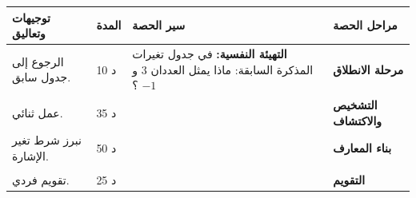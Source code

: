 \documentclass[12pt,a4paper]{article}
\newenvironment{LTR}{\begin{otherlanguage}{english}}{\end{otherlanguage}}
\newcommand{\ar}[1]{\foreignlanguage{arabic}{#1}}
\newcommand{\Phase}[1]{\textbf{#1}}
\newenvironment{Sayr}{%
\begin{LTR}\renewcommand{\arraystretch}{1.25}
\begin{longtable}{|p{0.17\textwidth}|>{\centering\arraybackslash}p{0.06\textwidth}|p{0.53\textwidth}|>{\centering\arraybackslash}p{0.12\textwidth}|}
\hline\rowcolor{cThm!12}\ar{\textbf{توجيهات وتعاليق}} & \ar{\textbf{المدة}} & \ar{\textbf{سير الحصة}} & \ar{\textbf{مراحل الحصة}}\\\hline\endhead
\hline\endfoot}{\end{longtable}\end{LTR}}
\newcommand{\Row}[4]{\ar{\small #4} & \ar{#3} & \ar{#2} & \cellcolor{cThm!8}\ar{\Phase{#1}}\\\hline}
\newcommand{\Lab}[2]{\foreignlanguage{english}{\tcbox[on line,colback=#1,colframe=#1,boxrule=0pt,arc=2pt,boxsep=1pt,left=5pt,right=5pt,top=1pt,bottom=1pt]{\ar{\textcolor{white}{\textbf{#2}}}}}}
\newcommand{\ck}{\ensuremath{{\color{cRem}\checkmark}}}
\begin{document}
\begin{Sayr}
\Row{مرحلة الانطلاق}{%
\textbf{التهيئة النفسية:} في جدول تغيرات المذكرة السابقة: ماذا يمثل العددان $3$ و $-1$ ؟}{10 د}{الرجوع إلى جدول سابق.}
\Row{التشخيص والاكتشاف}{%
\Lab{cEx}{وضعية مقترحة}\ $f(x)=x^2+2x+3$.\par\ck\ $f^{\prime}(x)=2x+2$ تنعدم عند $-1$ مغيرة إشارتها.\par
\ck\ $f(-1)=2$ أصغر قيمة لـ $f$ ؛ والمماس عند $(-1;2)$ أفقي.\par
}{35 د}{عمل ثنائي.}
\Row{بناء المعارف}{%
\Lab{cDef}{تعريف}\ $f(x_0)$ \textbf{قيمة حدية عظمى محلية} إذا وُجد مجال مفتوح $I$ يشمل $x_0$ يكون فيه $f(x)\leqslant f(x_0)$ (وصغرى إذا $f(x)\geqslant f(x_0)$).\par\Lab{cThm}{خاصية}\ إذا انعدمت $f^{\prime}$ عند $x_0$ \textbf{مغيرة إشارتها} فإن $f(x_0)$ قيمة حدية محلية.\par}{50 د}{نبرز شرط تغير الإشارة.}
\Row{}{%
\Lab{cEx}{مثال}\ $f(x)=x+\dfrac1x$ على $\mathbb R^*$: $f^{\prime}(x)=1-\dfrac1{x^2}=\dfrac{(x-1)(x+1)}{x^2}$.\par\smallskip\begin{LTR}\centering \begin{tikzpicture}[x=0.85cm,y=0.5cm,font=\footnotesize]
\draw (0,0) rectangle (9,-5); \draw (0,-1)--(9,-1); \draw (0,-2)--(9,-2); \draw (1.2,0)--(1.2,-5);
\draw (4.95,-1)--(4.95,-5); \draw (5.05,-1)--(5.05,-5);
\node at (0.6,-0.5){$x$}; \node at (0.6,-1.5){$f^{\prime}(x)$}; \node at (0.6,-3.5){$f(x)$};
\node at (1.7,-0.5){$-\infty$}; \node at (3,-0.5){$-1$}; \node at (5,-0.5){$0$}; \node at (7,-0.5){$1$}; \node at (8.4,-0.5){$+\infty$};
\node at (2.1,-1.5){$+$}; \node at (3,-1.5){$0$}; \node at (4,-1.5){$-$}; \node at (6,-1.5){$-$}; \node at (7,-1.5){$0$}; \node at (8,-1.5){$+$};
\node (a) at (3,-2.5){$-2$}; \node (b) at (7,-4.5){$2$};
\draw[->,cDef,thick] (1.5,-4.5)--(a); \draw[->,cDef,thick] (a)--(4.7,-4.5); \draw[->,cDef,thick] (5.3,-2.5)--(b); \draw[->,cDef,thick] (b)--(8.6,-2.5);
\end{tikzpicture}\end{LTR}\par $f(-1)=-2$ قيمة حدية عظمى محلية ، و $f(1)=2$ قيمة حدية صغرى محلية.\par\Lab{cThm!80!black}{حذار}\ $f(x)=x^3$: $f^{\prime}(0)=0$ لكن $f^{\prime}$ لا تغير إشارتها ، فلا توجد قيمة حدية عند $0$.}{}{}
\Row{التقويم}{%
\Lab{cEx}{تطبيق}\par عيّن القيم الحدية المحلية للدالة $f(x)=x^3-3x+1$ (المذكرة 15).\par\textbf{الحل:} $f^{\prime}$ تنعدم مغيرة إشارتها عند $-1$ و $1$: عظمى محلية $f(-1)=3$ ، صغرى محلية $f(1)=-1$.\par\textbf{واجب منزلي:} تمارين 25 إلى 28 صفحة 104 ، وتمرينا 42 و 43 صفحة 106.\par\smallskip\textbf{ملاحظات حول سير الحصة:} \dotfill}{25 د}{تقويم فردي.}
\end{Sayr}
\end{document}
